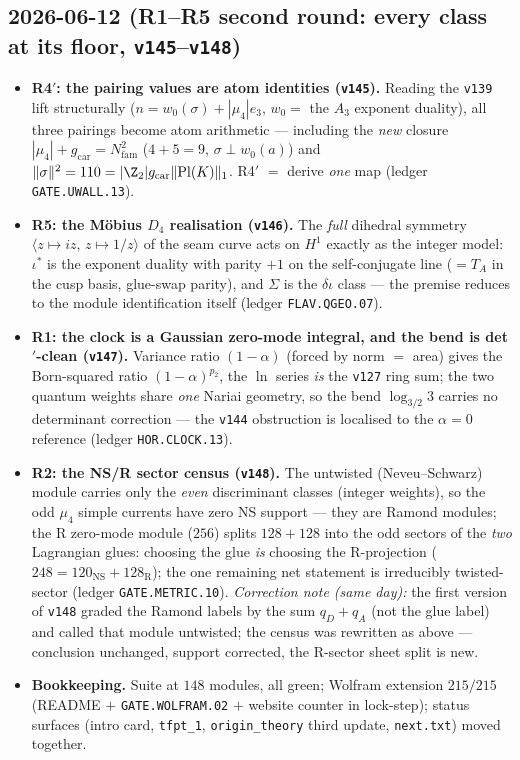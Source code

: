 \documentclass[11pt]{article}
\providecommand{\vref}[1]{\texttt{#1}}
\providecommand{\gcar}{g_{\mathrm{car}}}\providecommand{\Nfam}{N_{\mathrm{fam}}}
\begin{document}
\subsection*{2026-06-12 (R1--R5 second round: every class at its floor, \vref{v145}--\vref{v148})}
\begin{itemize}
\item \textbf{R4$'$: the pairing values are atom identities (\vref{v145}).} Reading the
  \vref{v139} lift structurally ($n=w_0(\sigma)+|\mu_4|e_3$, $w_0=$ the $A_3$ exponent
  duality), all three pairings become atom arithmetic --- including the \emph{new}
  closure $|\mu_4|+\gcar=\Nfam^2$ ($4{+}5{=}9$, $\sigma\perp w_0(a)$) and
  $\|\sigma\|^2=110=|\Z_2|\gcar\|\mathrm{Pl}(K)\|_1$. R4$'$ $=$ derive \emph{one} map
  (ledger \texttt{GATE.UWALL.13}).
\item \textbf{R5: the M\"obius $D_4$ realisation (\vref{v146}).} The \emph{full}
  dihedral symmetry $\langle z{\mapsto}iz,\,z{\mapsto}1/z\rangle$ of the seam curve acts
  on $H^1$ exactly as the integer model: $\iota^*$ is the exponent duality with parity
  $+1$ on the self-conjugate line ($=T_A$ in the cusp basis, glue-swap parity), and
  $\Sigma$ is the $\delta\iota$ class --- the premise reduces to the module
  identification itself (ledger \texttt{FLAV.QGEO.07}).
\item \textbf{R1: the clock is a Gaussian zero-mode integral, and the bend is
  det$'$-clean (\vref{v147}).} Variance ratio $(1-\alpha)$ (forced by norm $=$ area)
  gives the Born-squared ratio $(1-\alpha)^{p_2}$, the $\ln$ series \emph{is} the
  \vref{v127} ring sum; the two quantum weights share \emph{one} Nariai geometry, so the
  bend $\log_{3/2}3$ carries no determinant correction --- the \vref{v144} obstruction is
  localised to the $\alpha=0$ reference (ledger \texttt{HOR.CLOCK.13}).
\item \textbf{R2: the NS/R sector census (\vref{v148}).} The untwisted (Neveu--Schwarz)
  module carries only the \emph{even} discriminant classes (integer weights), so the odd
  $\mu_4$ simple currents have zero NS support --- they are Ramond modules; the R
  zero-mode module ($256$) splits $128{+}128$ into the odd sectors of the \emph{two}
  Lagrangian glues: choosing the glue \emph{is} choosing the R-projection
  ($248=120_{\mathrm{NS}}{+}128_{\mathrm R}$); the one remaining net statement is
  irreducibly twisted-sector (ledger \texttt{GATE.METRIC.10}). \emph{Correction note
  (same day):} the first version of \vref{v148} graded the Ramond labels by the sum
  $q_D{+}q_A$ (not the glue label) and called that module untwisted; the census was
  rewritten as above --- conclusion unchanged, support corrected, the R-sector sheet
  split is new.
\item \textbf{Bookkeeping.} Suite at $148$ modules, all green; Wolfram extension
  $215/215$ (README $+$ \texttt{GATE.WOLFRAM.02} $+$ website counter in lock-step);
  status surfaces (intro card, \texttt{tfpt\_1}, \texttt{origin\_theory} third update,
  \texttt{next.txt}) moved together.
\end{itemize}
\end{document}
